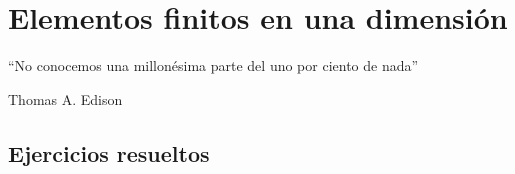 \setchapterpreamble[u]{\margintoc}

\chapter{Elementos finitos en una dimensión}

\begin{kaobox}
	``No conocemos una millonésima parte del uno por ciento de nada”
	\begin{flushright}
		Thomas A. Edison
	\end{flushright}
\end{kaobox}

\section{Ejercicios resueltos}

